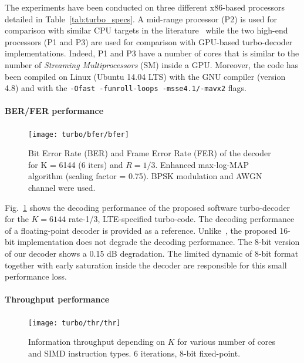 The experiments have been conducted on three different x86-based processors
detailed in Table~\ref{tab:turbo_specs}. A mid-range processor (P2) is used for
comparison with similar CPU targets in the literature~\cite{Huang2011,Zhang2012,
Wu2013} while the two high-end processors (P1 and P3) are used for comparison
with GPU-based turbo-decoder implementations. Indeed, P1 and P3 have a number of
cores that is similar to the number of \emph{Streaming Multiprocessors} (SM)
inside a GPU. Moreover, the code has been compiled on Linux (Ubuntu 14.04 LTS)
with the GNU compiler (version 4.8) and with the \texttt{-Ofast -funroll-loops
-msse4.1/-mavx2} flags.

\paragraph{BER/FER performance}

\begin{figure}
  \centering
  \texttt{[image: turbo/bfer/bfer]}
  \caption{Bit Error Rate (BER) and Frame Error Rate (FER) of the decoder for
    K = 6144 (6 iters) and $R=1/3$. Enhanced max-log-MAP algorithm (scaling
    factor = 0.75). BPSK modulation and AWGN channel were used.}
  \label{plot:turbo_bfer}
\end{figure}

Fig.~\ref{plot:turbo_bfer} shows the decoding performance of the proposed
software turbo-decoder for the $K = 6144$ rate-1/3, LTE-specified turbo-code.
The decoding performance of a floating-point decoder is provided as a reference.
Unlike~\cite{Wu2013}, the proposed 16-bit implementation does not degrade the
decoding performance. The 8-bit version of our decoder shows a 0.15 dB
degradation. The limited dynamic of 8-bit format together with early saturation
inside the decoder are responsible for this small performance loss.

\paragraph{Throughput performance}

\begin{figure}
  \centering
  \texttt{[image: turbo/thr/thr]}
  \caption{Information throughput depending on $K$ for various number of cores
    and SIMD instruction types. 6 iterations, 8-bit fixed-point.}
  \label{plot:turbo_thr}
\end{figure}

